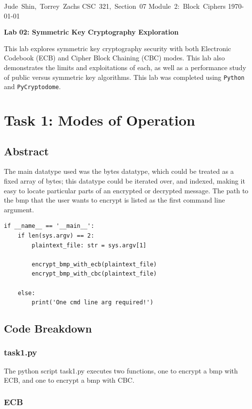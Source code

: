 \documentclass[11pt]{article}
\begin{document}
\hfill\vbox{\hbox{Jude Shin, Torrey Zachs}
		\hbox{CSC 321, Section 07}	
		\hbox{Module 2: Block Ciphers}	
		\hbox{\today}}\par

\bigskip
\centerline{\Large\bf Lab 02: Symmetric Key Cryptography Exploration}\par
\bigskip

This lab explores symmetric key cryptography security with both Electronic Codebook (ECB) and Cipher Block Chaining (CBC) modes. This lab also demonstrates the limits and exploitations of each, as well as a performance study of public versus symmetric key algorithms. This lab was completed using {\tt Python} and {\tt PyCryptodome}.
\section*{Task 1: Modes of Operation}
\subsection*{Abstract}
The main datatype used was the {\sc bytes} datatype, which could be treated as a fixed array of bytes; this datatype could be iterated over, and indexed, making it easy to locate particular parts of an encrypted or decrypted message. The path to the bmp that the user wants to encrypt is listed as the first command line argument.

\begin{framed}
\begin{verbatim}
if __name__ == '__main__':
    if len(sys.argv) == 2:
        plaintext_file: str = sys.argv[1]

        encrypt_bmp_with_ecb(plaintext_file)
        encrypt_bmp_with_cbc(plaintext_file)

    else:
        print('One cmd line arg required!')
\end{verbatim}
\end{framed}


\subsection*{Code Breakdown}
\subsubsection*{task1.py}
The python script {\sc task1.py} executes two functions, one to encrypt a bmp with ECB, and one to encrypt a bmp with CBC.
\subsubsection*{ECB}
\end{document}
